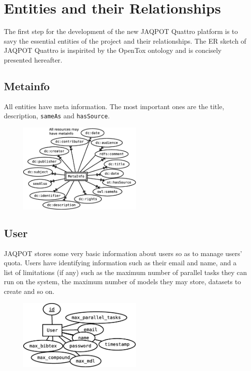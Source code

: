 \section{Entities and their Relationships}

The first step for the development of the new JAQPOT Quattro
platform is to savy the essential entities of the project
and their relationships.
The ER sketch of JAQPOT Quattro is inspirited by the OpenTox
ontology and is concisely presented hereafter.


\subsection{Metainfo}
All entities have meta information. The most important ones
are the title, description, \texttt{sameAs} and \texttt{hasSource}.

\begin{figure}[h]
 \centering
 \includegraphics[keepaspectratio=true,width=0.55\textwidth]{figures/metainfo}
\end{figure}

\subsection{User}
JAQPOT stores some very basic information about users so as to
manage users' quota. Users have identifying information such as 
their email and name, and a list of limitations (if any) such 
as the maximum number of parallel tasks they can run on the system,
the maximum number of models they may store, datasets to create and
so on.

\begin{figure}[h]
 \centering
 \includegraphics[keepaspectratio=true,width=0.55\textwidth]{figures/user}
\end{figure}

